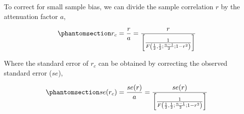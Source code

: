 \documentclass[
  letterpaper,
  DIV=11,
  numbers=noendperiod]{scrreprt}
\begin{document}
To correct for small sample bias, we can divide the sample correlation
\(r\) by the attenuation factor \(a\),

\begin{equation}\phantomsection\label{eq-r-corr}{
r_c = \frac{r}{a} = \frac{r}{\left[\frac{1}{F\left(\frac{1}{2},\frac{1}{2};\frac{n-1}{2};1-r^2\right)}\right]}
}\end{equation}

Where the standard error of \(r_c\) can be obtained by correcting the
observed standard error (\(se\)),

\begin{equation}\phantomsection\label{eq-se-corr}{
se(r_c) = \frac{se(r)}{a} = \frac{se(r)}{\left[\frac{1}{F\left(\frac{1}{2},\frac{1}{2};\frac{n-1}{2};1-r^2\right)}\right]}
}\end{equation}
\end{document}
